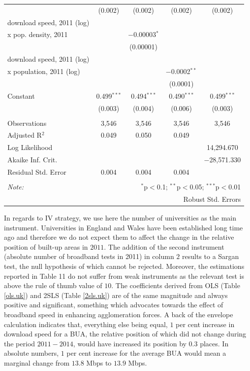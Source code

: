\documentclass[10pt,letterpaper]{article}
\begin{document}
\begin{table}[!htbp]
\begin{tabular}{@{\extracolsep{5pt}}lcccc}
  & (0.002) & (0.002) & (0.002) & (0.002) \\ 
  download speed, 2011 (log) \\
                             x pop. density, 2011 &  & $-$0.00003$^{*}$ &  &  \\ 
  &  & (0.00001) &  &  \\ 
  download speed, 2011 (log) \\
                             x population, 2011 (log) &  &  & $-$0.0002$^{**}$ &  \\ 
  &  &  & (0.0001) &  \\ 
  Constant & 0.499$^{***}$ & 0.494$^{***}$ & 0.490$^{***}$ & 0.499$^{***}$ \\ 
  & (0.003) & (0.004) & (0.006) & (0.003) \\ 
 \hline \\[-1.8ex] 
Observations & 3,546 & 3,546 & 3,546 & 3,546 \\ 
Adjusted R$^{2}$ & 0.049 & 0.050 & 0.049 &  \\ 
Log Likelihood &  &  &  & 14,294.670 \\ 
Akaike Inf. Crit. &  &  &  & $-$28,571.330 \\ 
Residual Std. Error & 0.004 & 0.004 & 0.004 &  \\ 
\hline 
\hline \\[-1.8ex] 
\textit{Note:}  & \multicolumn{4}{r}{$^{*}$p$<$0.1; $^{**}$p$<$0.05; $^{***}$p$<$0.01} \\ 
 & \multicolumn{4}{r}{Robust Std. Errors} \\ 
\end{tabular} 
\end{table}

In regards to IV strategy, we use here the number of universities as the
main instrument. Universities in England and Wales have been established
long time ago and therefore we do not expect them to affect the change
in the relative position of built-up areas in \(2011\). The addition of
the second instrument (absolute number of broadband tests in 2011) in
column \(2\) results to a Sargan test, the null hypothesis of which
cannot be rejected. Moreover, the estimations reported in Table 11 do
not suffer from weak instruments as the relevant test is above the rule
of thumb value of \(10\). The coefficients derived from OLS (Table
\ref{ols.uk}) and 2SLS (Table \ref{2sls.uk}) are of the same magnitude
and always positive and significant, something which advocates towards
the effect of broadband speed in enhancing agglomeration forces. A back
of the envelope calculation indicates that, everything else being equal,
\(1\) per cent increase in download speed for a BUA, the relative
position of which did not change during the period \(2011-2014\), would
have increased its position by \(0.3\) places. In absolute numbers,
\(1\) per cent increase for the average BUA would mean a marginal change
from \(13.8\) Mbps to \(13.9\) Mbps.
\end{document}
